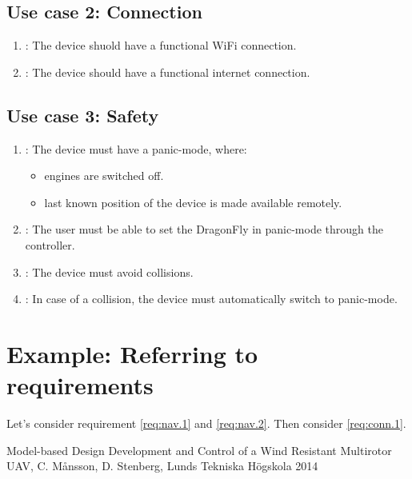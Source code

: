 \documentclass[a4paper]{article}
\makeatletter
\newcommand{\labitem}[2]{%
\def\@itemlabel{\textbf{#2}}
\item
\def\@currentlabel{#2}\label{#1}}
\makeatother
\begin{document}
\subsection{Use case 2: Connection}

\setlength{\parindent}{3cm}

\begin{enumerate}
\labitem{req:conn.1}{Connection.1}: The device shuold have a functional WiFi connection.
\labitem{req:conn.2}{Connection.2}: The device should have a functional internet connection.
\end{enumerate}

\subsection{Use case 3: Safety}

\begin{enumerate}
\labitem{req:safe.1}{Safety.1}: The device must have a panic-mode, where:
\begin{itemize}
\item engines are switched off.
\item last known position of the device is made available remotely.
\end{itemize}
\labitem{req:safe.2}{Safety.2}: The user must be able to set the DragonFly in panic-mode through the controller.
\labitem{req:safe.3}{Safety.3}: The device must avoid collisions.
\labitem{req:safe.4}{Safety.4}: In case of a collision, the device must automatically switch to panic-mode.
\end{enumerate}

\section{Example: Referring to requirements}
Let's consider requirement \ref{req:nav.1} and \ref{req:nav.2}. Then consider \ref{req:conn.1}.


\begin{thebibliography}{99}
 Model-based Design Development and Control of a Wind Resistant Multirotor UAV, C. Månsson, D. Stenberg, Lunds Tekniska Högskola 2014
\end{thebibliography}
\end{document}
